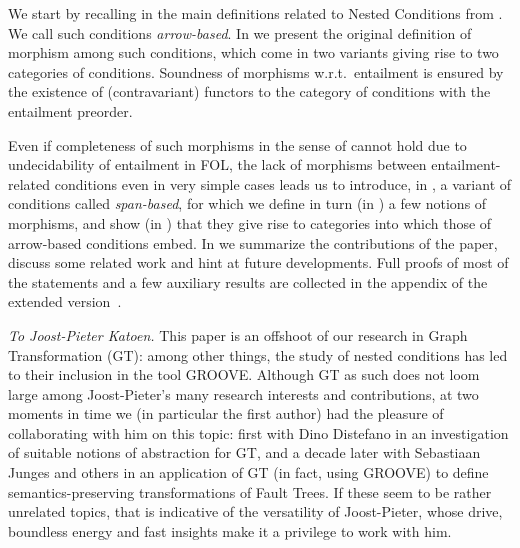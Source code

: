 We start by recalling in  the main definitions related to Nested Conditions from \cite{Rensink-FOL}. We call such conditions \emph{arrow-based}.
In  we present the original definition of morphism among such conditions, which come in two variants giving rise to two categories of conditions. Soundness of morphisms w.r.t.~entailment is ensured by the existence of (contravariant) functors to the category of conditions with the entailment preorder.

Even if completeness of such morphisms in the sense of \cite{DBLP:conf/stoc/ChandraM77} cannot hold due to undecidability of entailment in FOL, the lack of morphisms between entailment-related conditions even in very simple cases leads us to introduce, in , a variant of conditions called \emph{span-based}, for which we define in turn (in ) a few notions of morphisms, and show (in ) that they give rise to categories into which those of arrow-based conditions embed.
In  we summarize the contributions of the paper, discuss some related work and hint at future developments.
\iffest
Full proofs of most of the statements and a few auxiliary results are collected in the appendix of the extended version~\cite{RensinkCorradini-JPK2024-full}. 

\medskip\noindent 
\emph{To Joost-Pieter Katoen.} This paper is an offshoot of our research in Graph Transformation (GT): among other things, the study of nested conditions has led to their inclusion in the tool GROOVE. Although GT as such does not loom large among Joost-Pieter's many research interests and contributions, at two moments in time we (in particular the first author) had the pleasure of collaborating with him on this topic: first with Dino Distefano in an investigation of suitable notions of abstraction for GT, and a decade later with Sebastiaan Junges and others in an application of GT (in fact, using GROOVE) to define semantics-preserving transformations of Fault Trees. If these seem to be rather unrelated topics, that is indicative of the versatility of Joost-Pieter, whose drive, boundless energy and fast insights make it a privilege to work with him.
\fi
 